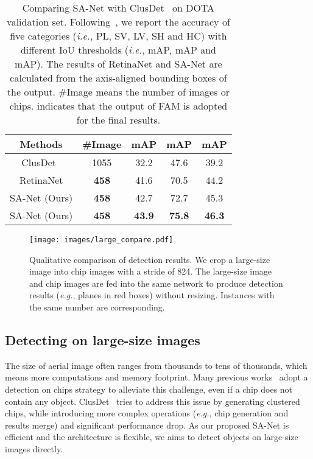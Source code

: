 \documentclass[10pt,journal,final]{IEEEtran}
\def\eg{{\em e.g.}}
\def\ie{{\em i.e.}}
\begin{document}
\begin{table}[!t]
  \caption{Comparing SA-Net with ClusDet~\cite{Yang2019clusdet} on DOTA validation set. Following~\cite{Yang2019clusdet}, we report the accuracy of five categories (\ie, PL, SV, LV, SH and HC) with different IoU thresholds (\ie, mAP, mAP and mAP). The results of RetinaNet and SA-Net are calculated from the axis-aligned bounding boxes of the output. \#Image means the number of images or chips.  indicates that the output of FAM is adopted for the final results.}
  \vspace{-2mm}
  \centering
\begin{tabular}{c|c|ccc}
\hline
Methods                        & \#Image         & mAP & mAP & mAP \\ \hline
ClusDet~\cite{Yang2019clusdet} & 1055            & 32.2      & 47.6   & 39.2    \\
RetinaNet                      & \textbf{458}    & 41.6     & 70.5  & 44.2 \\
SA-Net (Ours)       & \textbf{458}    & 42.7      & 72.7  & 45.3   \\
SA-Net (Ours)              & \textbf{458}    & \textbf{43.9}      & \textbf{75.8}  & \textbf{46.3}   \\ \hline
\end{tabular}   \label{tab:compare_clusdet}
  \vspace{-3mm}
\end{table}

\begin{figure}[!t]
  \centering
  \texttt{[image: images/large\_compare.pdf]}
  \vspace{-3mm}
  \caption{Qualitative comparison of detection results. We crop a large-size image into  chip images with a stride of 824. The large-size image and chip images are fed into the same network to produce detection results (\eg, planes in red boxes) without resizing. Instances with the same number are corresponding.}
  \label{fig:large_compare}
  \vspace{-4mm}
\end{figure}

\subsection{Detecting on large-size images}
\label{sec:det_large}
The size of aerial image often ranges from thousands to tens of thousands, which means more computations and memory footprint. Many previous works~\cite{xia2018dota, ding2018transformer} adopt a detection on chips strategy to alleviate this challenge, even if a chip does not contain any object. ClusDet~\cite{Yang2019clusdet} tries to address this issue by generating clustered chips, while introducing more complex operations (\eg, chip generation and results merge) and significant performance drop. As our proposed SA-Net is efficient and the architecture is flexible, we aims to detect objects on large-size images directly. 
\end{document}
